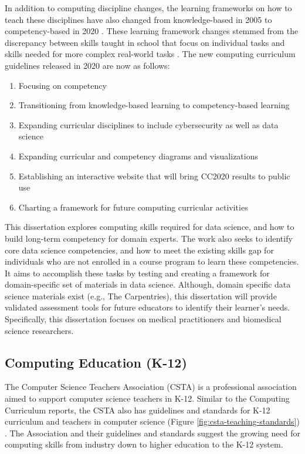\documentclass[010-intro.tex]{subfiles}
\begin{document}
    In addition to computing discipline changes,
    the learning frameworks on how to teach these disciplines have also changed
    from knowledge-based in 2005 to competency-based in 2020
    \cite{cc2020}.
    These learning framework changes stemmed from the discrepancy between
    skills taught in school that focus on individual tasks and skills needed for more complex real-world tasks
    \cite{cc2020}.
    The new computing curriculum guidelines released in 2020 are now as follows:

    \begin{enumerate}
        \item Focusing on competency
        \item Transitioning from knowledge-based learning to competency-based learning
        \item Expanding curricular disciplines to include cybersecurity as well as data science
        \item Expanding curricular and competency diagrams and visualizations
        \item Establishing an interactive website that will bring CC2020 results to public use
        \item Charting a framework for future computing curricular activities
    \end{enumerate}

    This dissertation explores computing skills required for data science,
    and how to build long-term competency for domain experts.
    The work also seeks to identify core data science competencies,
    and how to meet the existing skills gap for individuals who are not enrolled
    in a course program to learn these competencies.
    It aims to accomplish these tasks by
    testing and creating a framework for domain-specific set of materials in data science.
    Although, domain specific data science materials exist (e.g., The Carpentries),
    this dissertation will provide validated assessment tools for future educators to identify their
    learner's needs.
    Specifically, this dissertation focuses on medical practitioners and biomedical science researchers.

\subsection{Computing Education (K-12)}
\label{sse:computek12}

    The Computer Science Teachers Association (CSTA)
    is a professional association aimed to support computer science teachers in K-12.
    Similar to the Computing Curriculum reports,
    the CSTA also has guidelines and standards for K-12 curriculum and teachers in computer science
    (Figure \ref{fig:csta-teaching-standards})
    \cite{csta2017}.
    The Association and their guidelines and standards suggest the growing need for computing skills from
    industry down to higher education to the K-12 system.
\end{document}

